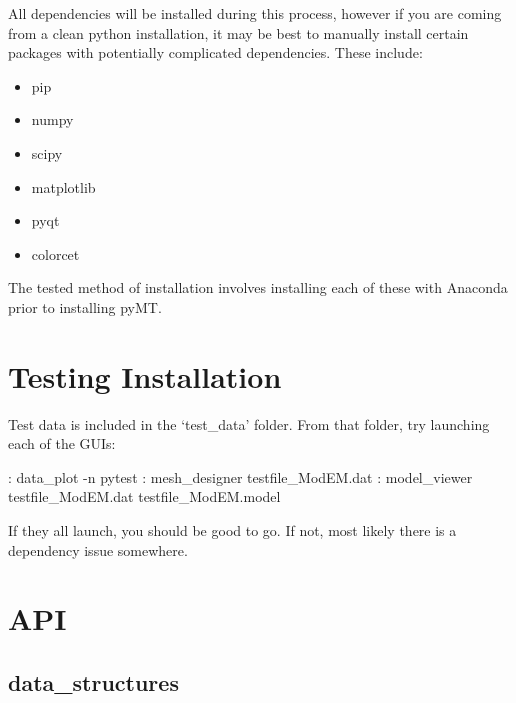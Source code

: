 \documentclass[letterpaper,10pt,english]{sphinxmanual}
\begin{document}
All dependencies will be installed during this process, however if you are coming from a clean python installation, it may be best to manually install certain packages with potentially complicated dependencies.
These include:
\begin{itemize}
\item {} 
pip

\item {} 
numpy

\item {} 
scipy

\item {} 
matplotlib

\item {} 
pyqt

\item {} 
colorcet

\end{itemize}

The tested method of installation involves installing each of these with Anaconda prior to installing pyMT.


\chapter{Testing Installation}
\label{\detokenize{content/api_core/testing_installation:testing-installation}}\label{\detokenize{content/api_core/testing_installation::doc}}
Test data is included in the ‘test\_data’ folder.
From that folder, try launching each of the GUIs:

{\hyperref[\detokenize{content/data_plot/main_window:data-plot}]{}}: data\_plot -n pytest
{\hyperref[\detokenize{content/mesh_designer/main_window:mesh-designer}]{}}: mesh\_designer testfile\_ModEM.dat
{\hyperref[\detokenize{content/model_viewer/main_window:model-viewer}]{}}: model\_viewer testfile\_ModEM.dat testfile\_ModEM.model

If they all launch, you should be good to go.
If not, most likely there is a dependency issue somewhere.


\chapter{API}
\label{\detokenize{index:api}}

\section{data\_structures}
\label{\detokenize{content/api_core/data_structures:data-structures}}\label{\detokenize{content/api_core/data_structures::doc}}
\end{document}
